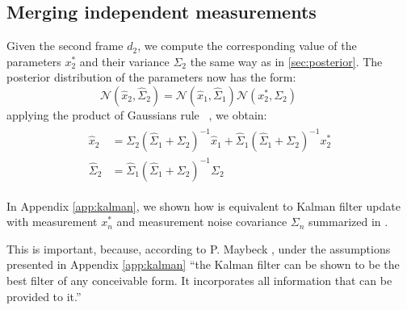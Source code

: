 \subsection{Merging independent measurements} 
\label{sec:combining}

Given the second frame $d_2$, we compute the corresponding value of the parameters $x_2^*$ and their variance $\Sigma_2$ the same way as in \ref{sec:posterior}. The posterior distribution of the parameters now has the form:
% 
\begin{equation}
\mathcal{N}(\hat{x}_2, \hat{\Sigma}_2) = \mathcal{N}(\hat{x}_1, \hat{\Sigma}_1) \mathcal{N}(x_2^*, \Sigma_2) \quad\quad
\end{equation}
% 
applying the product of Gaussians rule ~\cite{petersen2008matrix}, we obtain:
% 
\begin{align}
\begin{split}
\hat{x}_2 &= \Sigma_2 (\hat{\Sigma}_1 + \Sigma_2)^{-1} \hat{x}_1 + 
\hat{\Sigma}_1 (\hat{\Sigma}_1 + \Sigma_2)^{-1} x_2^*
\\
\hat{\Sigma}_2 &= \hat{\Sigma}_1 (\hat{\Sigma}_1 + \Sigma_2)^{-1} \Sigma_2
\label{eq:combining}
\end{split}
\end{align}

In Appendix \ref{app:kalman}, we shown how  is equivalent to Kalman filter update with measurement $x_n^*$ and measurement noise covariance $\Sigma_n$ summarized in .

This is important, because, according to P. Maybeck \cite{maybeck1979stochastic}, under the assumptions presented in Appendix \ref{app:kalman} ``the Kalman filter can be shown to be the best filter of any conceivable form. It incorporates all information that can be provided to it.''

